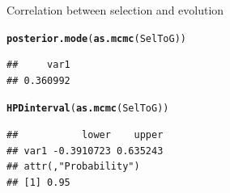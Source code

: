 \documentclass{article}\usepackage[]{graphicx}\usepackage[]{color}
\makeatletter
\newcommand{\hlstd}[1]{\textcolor[rgb]{0.345,0.345,0.345}{#1}}%
\newcommand{\hlkwd}[1]{\textcolor[rgb]{0.737,0.353,0.396}{\textbf{#1}}}%
\newenvironment{kframe}{%
 \def\at@end@of@kframe{}%
 \ifinner\ifhmode%
  \def\at@end@of@kframe{\end{minipage}}%
  \begin{minipage}{\columnwidth}%
 \fi\fi%
 \def\FrameCommand##1{\hskip\@totalleftmargin \hskip-\fboxsep
 \colorbox{shadecolor}{##1}\hskip-\fboxsep
     \hskip-\linewidth \hskip-\@totalleftmargin \hskip\columnwidth}%
 \MakeFramed {\advance\hsize-\width
   \@totalleftmargin\z@ \linewidth\hsize
   \@setminipage}}%
 {\par\unskip\endMakeFramed%
 \at@end@of@kframe}
\newenvironment{knitrout}{}{} %
\makeatother
\begin{document}

Correlation between selection and evolution
\begin{knitrout}
\color{fgcolor}\begin{kframe}
\begin{alltt}
\hlkwd{posterior.mode}\hlstd{(}\hlkwd{as.mcmc}\hlstd{(SelToG))}
\end{alltt}
\begin{verbatim}
##     var1 
## 0.360992
\end{verbatim}
\begin{alltt}
\hlkwd{HPDinterval}\hlstd{(}\hlkwd{as.mcmc}\hlstd{(SelToG))}
\end{alltt}
\begin{verbatim}
##           lower    upper
## var1 -0.3910723 0.635243
## attr(,"Probability")
## [1] 0.95
\end{verbatim}
\end{kframe}
\end{knitrout}
 
\end{document}
